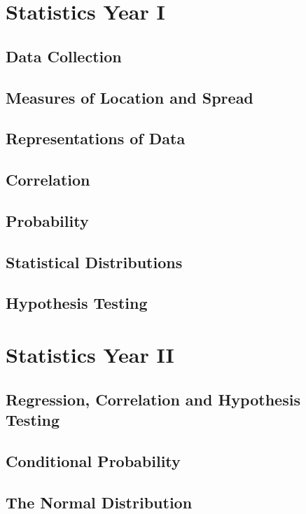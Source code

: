 \section{Statistics Year I} \label{statistics_i}
\subsection{Data Collection} \label{data_collection}
\newpage

\subsection{Measures of Location and Spread} \label{measures_of_location_and_spread}
\newpage

\subsection{Representations of Data} \label{representations_of_data}
\newpage

\subsection{Correlation} \label{correlation}
\newpage

\subsection{Probability} \label{probability}
\newpage

\subsection{Statistical Distributions} \label{statistical_distributions}
\newpage

\subsection{Hypothesis Testing} \label{hypothesis_testing}
\newpage

\section{Statistics Year II} \label{statistics_ii}
\subsection{Regression, Correlation and Hypothesis Testing} \label{regression_correlation_and_hypothesis_testing}
\newpage

\subsection{Conditional Probability} \label{conditional_probability}
\newpage

\subsection{The Normal Distribution} \label{the_normal_distribution}
\newpage